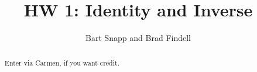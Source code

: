 \documentclass[handout,space,nooutcomes]{xourse}
\title{HW 1: Identity and Inverse}
\author{Bart Snapp and Brad Findell}
\begin{document}
\begin{abstract}
Enter via Carmen, if you want credit.  
\end{abstract}
\maketitle

{}
\end{document}
